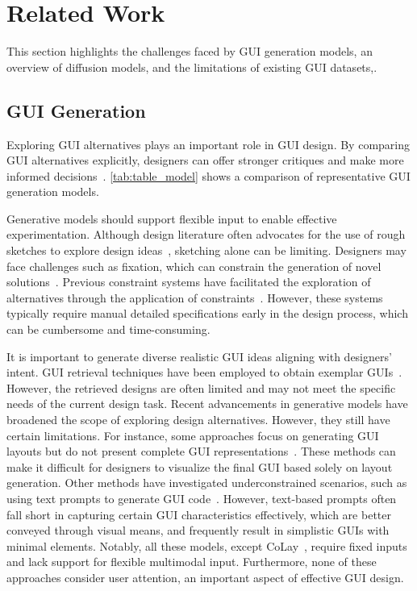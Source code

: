 \section{Related Work}

This section highlights the challenges faced by GUI generation models, an overview of diffusion models, and the limitations of existing GUI datasets,.



\subsection{GUI Generation}

Exploring GUI alternatives plays an important role in GUI design.   By comparing GUI alternatives explicitly, designers can offer stronger critiques and make more informed decisions~\cite{dow2011prototyping, tohidi2006getting, jiang2022computational, jiang2024computational2, jiang2023future, jiang2024computational}. \autoref{tab:table_model} shows a comparison of representative GUI generation models. 


Generative models should support flexible input to enable effective experimentation. Although design literature often advocates for the use of rough sketches to explore design ideas~\cite{boyarski1994computers, landay1996silk}, sketching alone can be limiting. Designers may face challenges such as fixation, which can constrain the generation of novel solutions~\cite{jansson1991design}. Previous constraint systems have facilitated the exploration of alternatives through the application of constraints~\cite{swearngin2020scout, jiang2019orclayout, jiang2020orcsolver, jiang2020reverseorc, jiang2024flexdoc}. However, these systems typically require manual detailed specifications early in the design process, which can be cumbersome and time-consuming.


It is important to generate diverse realistic GUI ideas aligning with designers' intent. 
GUI retrieval techniques have been employed to obtain exemplar GUIs~\cite{herring2009getting, kumar2013webzeitgeist, li2021screen2vec}. However, the retrieved designs are often limited and may not meet the specific needs of the current design task. Recent advancements in generative models have broadened the scope of exploring design alternatives. However, they still have certain limitations. For instance, some approaches focus on generating GUI layouts but do not present complete GUI representations~\cite{cheng2023play, cheng2024colay}. These methods can make it difficult for designers to visualize the final GUI based solely on layout generation. Other methods have investigated underconstrained scenarios, such as using text prompts to generate GUI code~\cite{wu2024uicoder}. However, text-based prompts often fall short in capturing certain GUI characteristics effectively, which are better conveyed through visual means, and frequently result in simplistic GUIs with minimal elements. Notably, all these models, except CoLay~\cite{cheng2024colay}, require fixed inputs and lack support for flexible multimodal input. Furthermore, none of these approaches consider user attention, an important aspect of effective GUI design.

